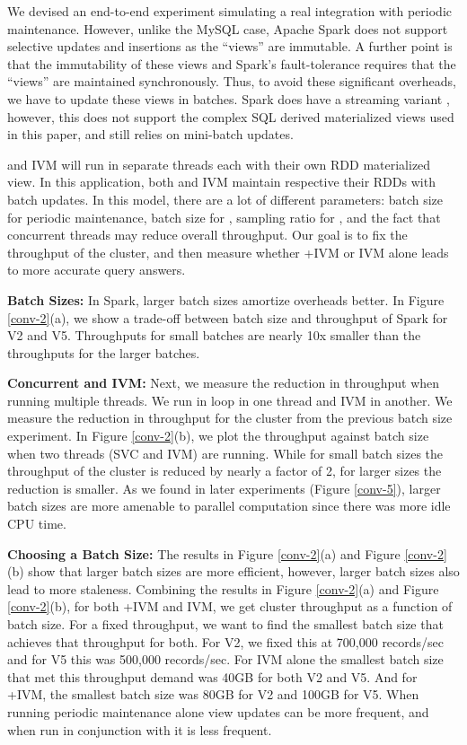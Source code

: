 We devised an end-to-end experiment simulating a real integration with periodic maintenance.
However, unlike the MySQL case, Apache Spark does not support selective updates and insertions as the ``views'' are immutable.
A further point is that the immutability of these views and Spark's fault-tolerance requires that the ``views'' are maintained synchronously.
Thus, to avoid these significant overheads, we have to update these views in batches.
Spark does have a streaming variant \cite{zaharia2012discretized}, however, this does not support the complex SQL derived materialized views used in this paper, and still relies on mini-batch updates.

\svc and IVM will run in separate threads each with their own RDD materialized view.
In this application, both \svc and IVM maintain respective their RDDs with batch updates.
In this model, there are a lot of different parameters: batch size for periodic maintenance, batch size for \svc, sampling ratio for \svc, and the fact that concurrent threads may reduce overall throughput.
Our goal is to fix the throughput of the cluster, and then measure whether \svcnospace+IVM or IVM alone leads to more accurate query answers.

\textbf{Batch Sizes:} In Spark, larger batch sizes amortize overheads better.
In Figure \ref{conv-2}(a), we show a trade-off between batch size and throughput of Spark for V2 and V5.
Throughputs for small batches are nearly 10x smaller than the throughputs for the larger batches. 

\textbf{Concurrent \svc and IVM:} Next, we measure the reduction in throughput when running multiple threads.
We run  in loop in one thread and IVM in another.
We measure the reduction in throughput for the cluster from the previous batch size experiment.
In Figure \ref{conv-2}(b), we plot the throughput against batch size when two threads (SVC and IVM) are running.
While for small batch sizes the throughput of the cluster is reduced by nearly a factor of 2, for larger sizes the reduction is
smaller.
As we found in later experiments (Figure \ref{conv-5}), larger batch sizes are more amenable to parallel computation since there was more idle CPU time.


\textbf{Choosing a Batch Size:}
The results in Figure \ref{conv-2}(a) and Figure \ref{conv-2}(b) show that larger batch sizes are more efficient, however, larger batch sizes also lead to more staleness.
Combining the results in Figure \ref{conv-2}(a) and Figure \ref{conv-2}(b), for both \svcnospace+IVM and IVM, we get cluster throughput as a function of batch size.
For a fixed throughput, we want to find the smallest batch size that achieves that throughput for both.
For V2, we fixed this at 700,000 records/sec and for V5 this was 500,000 records/sec.
For IVM alone the smallest batch size that met this throughput demand was 40GB for both V2 and V5.
And for \svcnospace+IVM, the smallest batch size was 80GB for V2 and 100GB for V5. 
When running periodic maintenance alone view updates can be more frequent, and when run in conjunction with \svc it is less frequent. 

